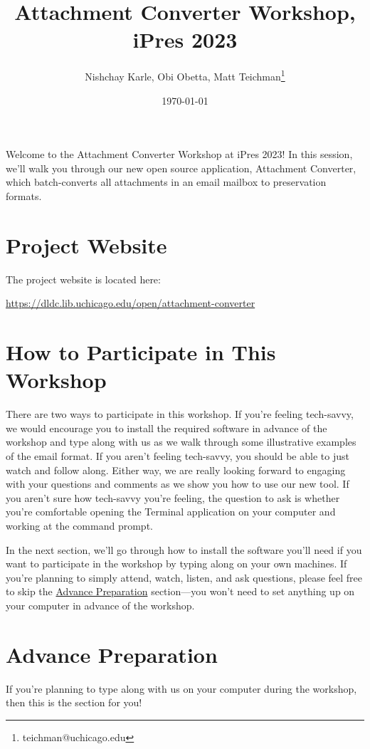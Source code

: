 \documentclass[11pt]{article}
\author{Nishchay Karle, Obi Obetta, Matt Teichman\thanks{teichman@uchicago.edu}}
\date{\today}
\title{Attachment Converter Workshop, iPres 2023}
\begin{document}
\maketitle
Welcome to the Attachment Converter Workshop at iPres 2023!  In this
session, we'll walk you through our new open source application,
Attachment Converter, which batch-converts all attachments in an email
mailbox to preservation formats.

\section*{Project Website}
\label{sec:orgffd596e}

The project website is located here:

\url{https://dldc.lib.uchicago.edu/open/attachment-converter}

\section*{How to Participate in This Workshop}
\label{sec:org17762da}

There are two ways to participate in this workshop.  If you're feeling
tech-savvy, we would encourage you to install the required software in
advance of the workshop and type along with us as we walk through some
illustrative examples of the email format.  If you aren't feeling
tech-savvy, you should be able to just watch and follow along.  Either
way, we are really looking forward to engaging with your questions and
comments as we show you how to use our new tool.  If you aren't sure
how tech-savvy you're feeling, the question to ask is whether you're
comfortable opening the Terminal application on your computer and
working at the command prompt.

In the next section, we'll go through how to install the software
you'll need if you want to participate in the workshop by typing along
on your own machines.  If you're planning to simply attend, watch,
listen, and ask questions, please feel free to skip the \hyperref[org2d0da06]{Advance
Preparation} section---you won't need to set anything up on your
computer in advance of the workshop.

\section*{Advance Preparation \label{org2d0da06}}
\label{sec:orgf0c550d}

If you're planning to type along with us on your computer during the
workshop, then this is the section for you!
\end{document}
